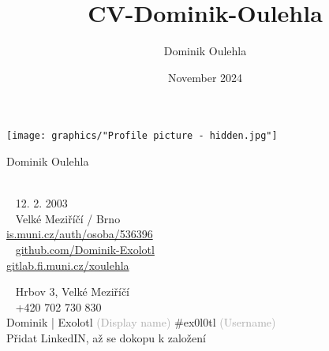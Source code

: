 \documentclass{modernsimplecv}
\title{CV-Dominik-Oulehla}
\author{Dominik Oulehla}
\date{November 2024}
\begin{document}
\thispagestyle{empty}




\begin{minipage}[t]{0.21\textwidth}

    \vspace{0pt} %

    \texttt{[image: graphics/"Profile picture - hidden.jpg"]}\hspace{1em}

\end{minipage}
\hfill
\begin{minipage}[t]{0.77\textwidth}
    \vspace{0pt} %
    \begin{shaded*}
        \begin{minipage}[t]{0.4\textwidth}
            \vspace{0pt} %
            {\par\centering\huge\textsf{Dominik Oulehla}} \\[0.3cm]
            \faBirthdayCake~ 12. 2. 2003 \\
            \faMapMarker~ Velké Meziříčí / Brno \\
            {\small
             \protect\url{is.muni.cz/auth/osoba/536396} \\
            \faGithub~ \protect\url{github.com/Dominik-Exolotl} \\
             \protect\url{gitlab.fi.muni.cz/xoulehla}
            }
        \end{minipage}\hfill
        \begin{minipage}[t]{0.55\textwidth}
            \vspace{0pt}
            \faEnvelopeO~ Hrbov 3, Velké Meziříčí \\
            \faPhone~ +420 702 730 830 \\
             Dominik | Exolotl \scriptsize \textcolor{darkgrey}{(Display name)}\normalsize{ \#ex0l0tl} \scriptsize \textcolor{darkgrey}{(Username)} \normalsize\\
             \small{Přidat LinkedIN, až se dokopu k založení} \normalsize \\[0.175cm]

\end{minipage}
\end{shaded*}
\end{minipage}
\end{document}
